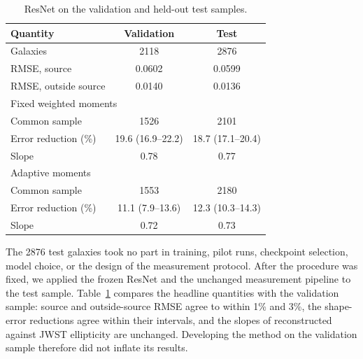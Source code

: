 \documentclass[longauth]{aa}
\begin{document}
\begin{table}
    \caption{ResNet on the validation and held-out test samples.}
    \label{tab:test}
    \centering
    \small
    \setlength{\tabcolsep}{4pt}
    \begin{tabular}{lcc}
        \hline\hline
        Quantity & Validation & Test \\
        \hline
        Galaxies & 2118 & 2876 \\
        RMSE, source & 0.0602 & 0.0599 \\
        RMSE, outside source & 0.0140 & 0.0136 \\
        \hline
        \multicolumn{3}{l}{Fixed weighted moments} \\
        Common sample & 1526 & 2101 \\
        Error reduction (\%) & 19.6 (16.9--22.2) & 18.7 (17.1--20.4) \\
        Slope & 0.78 & 0.77 \\
        \hline
        \multicolumn{3}{l}{Adaptive moments} \\
        Common sample & 1553 & 2180 \\
        Error reduction (\%) & 11.1 (7.9--13.6) & 12.3 (10.3--14.3) \\
        Slope & 0.72 & 0.73 \\
        \hline
    \end{tabular}
\end{table}

The 2876 test galaxies took no part in training, pilot runs, checkpoint selection, model choice, or the design of the measurement protocol.
After the procedure was fixed, we applied the frozen ResNet and the unchanged measurement pipeline to the test sample.
Table~\ref{tab:test} compares the headline quantities with the validation sample: source and outside-source RMSE agree to within 1\% and 3\%, the shape-error reductions agree within their intervals, and the slopes of reconstructed against JWST ellipticity are unchanged.
Developing the method on the validation sample therefore did not inflate its results.
\end{document}

